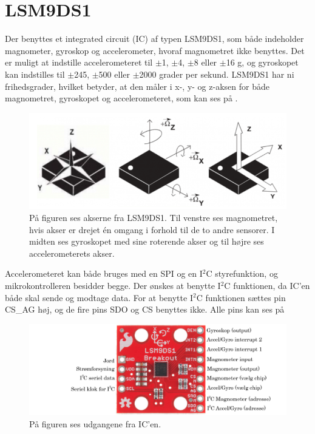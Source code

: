 \section{LSM9DS1}
Der benyttes et integrated circuit (IC) af typen LSM9DS1, som både indeholder magnometer, gyroskop og accelerometer, hvoraf magnometret ikke benyttes. Det er muligt at indstille accelerometeret til $\pm$1, $\pm$4, $\pm$8 eller $\pm$16 g, og gyroskopet kan indstilles til $\pm$245, $\pm$500 eller $\pm$2000 grader per sekund. \citep{Jimb02016} \newline
LSM9DS1 har ni frihedsgrader, hvilket betyder, at den måler i x-, y- og z-aksen for både magnometret, gyroskopet og accelerometeret, som kan ses på . %
\citep{Jimb02016}\newline 
\begin{figure}[H]
	\centering
	\includegraphics[scale=0.6]{figures/cDesign/LSM9DS1.png}
	\caption{På figuren ses akserne fra LSM9DS1. Til venstre ses magnometret, hvis akser er drejet én omgang i forhold til de to andre sensorer. I midten ses gyroskopet med sine roterende akser og til højre ses accelerometerets akser.\citep{Jimb02016}}
	\label{vores_IC}
\end{figure}
Accelerometeret kan både bruges med en SPI og en I$^{2}$C styrefunktion, og mikrokontrolleren besidder begge. Der ønskes at benytte I$^{2}$C funktionen, da IC'en både skal sende og modtage data. For at benytte I$^{2}$C funktionen sættes pin CS\_AG høj, og de fire pins SDO og CS benyttes ikke. Alle pins kan ses på 
\begin{figure}[H]
	\centering
	\includegraphics[scale=0.35]{figures/cDesign/accelerometeret.png}
	\caption{På figuren ses udgangene fra IC'en.\citep{Jimb02016}}
	\label{IC_pins}
\end{figure}
